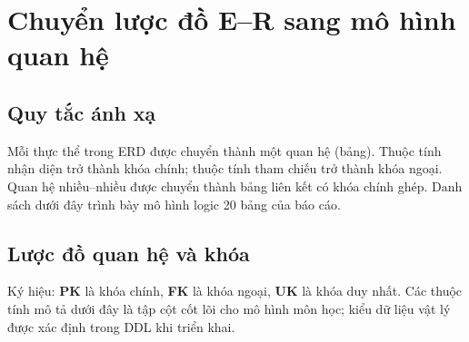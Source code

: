 \chapter{Chuyển lược đồ E--R sang mô hình quan hệ}

\section{Quy tắc ánh xạ}
Mỗi thực thể trong ERD được chuyển thành một quan hệ (bảng). Thuộc tính nhận diện trở thành khóa chính; thuộc tính tham chiếu trở thành khóa ngoại. Quan hệ nhiều--nhiều được chuyển thành bảng liên kết có khóa chính ghép. Danh sách dưới đây trình bày mô hình logic 20 bảng của báo cáo.

\section{Lược đồ quan hệ và khóa}
Ký hiệu: \textbf{PK} là khóa chính, \textbf{FK} là khóa ngoại, \textbf{UK} là khóa duy nhất. Các thuộc tính mô tả dưới đây là tập cột cốt lõi cho mô hình môn học; kiểu dữ liệu vật lý được xác định trong DDL khi triển khai.

